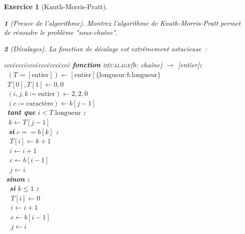 \documentclass{article}
\theoremstyle{exostyle}
\newtheorem{exo}{Exercice}
\theoremstyle{partiestyle}
\newtheorem{partie}{}[exo]
\theoremstyle{questionstyle}
\begin{document}
\begin{exo}[Knuth-Morris-Pratt]
    \begin{partie}[Preuve de l'algorithme]
        Montrez l'algorithme de Knuth-Morris-Pratt permet de résoudre le problème "sous-chaîne".
    \end{partie}

    \begin{partie}[Décalages]
        La fonction de décalage est extrêmement astucieuse~:\\
        \begin{tabbing}
            ccc\=cccc\=cccc\=cccc\=cccc\=cccc\=\kill
            \textbf{fonction} \textsc{décalage}($b$: chaîne) $\rightarrow$ [entier]{\bf :}\\
            \>\vline$\,$ $(T \coloneqq [\text{entier}]) \leftarrow [\text{entier}]\{\text{longueur:} b.\text{longueur}\}$\\
            \>\vline$\,$ $T[0], T[1] \leftarrow 0, 0$\\
            \>\vline$\,$ $(i, j, k \coloneqq \text{entier}) \leftarrow 2, 2, 0$\\
            \>\vline$\,$ $(c \coloneqq \text{caractère}) \leftarrow b[j-1]$\\
            \>\vline$\,$ \textbf{tant que} $i < T.\text{longueur}$ {\bf :}\\
            \>\vline$\,$\>\vline$\,$ $k \leftarrow T[j-1]$\\
            \>\vline$\,$\>\vline$\,$ \textbf{si } $c == b[k]$ {\bf :}\\
            \>\vline$\,$\>\vline$\,$\>\vline$\,$ $T[i] \leftarrow k + 1$\\
            \>\vline$\,$\>\vline$\,$\>\vline$\,$ $i \leftarrow i + 1$\\
            \>\vline$\,$\>\vline$\,$\>\vline$\,$ $c \leftarrow b[i-1]$\\
            \>\vline$\,$\>\vline$\,$\>\vline$\,$ $j \leftarrow i$\\
            \>\vline$\,$\>\vline$\,$\textbf{sinon} {\bf :} \\
            \>\vline$\,$\>\vline$\,$\>\vline$\,$ \textbf{si } $k \leq 1$ {\bf :}\\
            \>\vline$\,$\>\vline$\,$\>\vline$\,$\>\vline$\,$ $T[i] \leftarrow 0$\\
            \>\vline$\,$\>\vline$\,$\>\vline$\,$\>\vline$\,$ $i \leftarrow i + 1$\\
            \>\vline$\,$\>\vline$\,$\>\vline$\,$\>\vline$\,$ $c \leftarrow b[i-1]$\\
            \>\vline$\,$\>\vline$\,$\>\vline$\,$\>\vline$\,$ $j \leftarrow i$\\

\end{tabbing}
\end{partie}
\end{exo}
\end{document}
